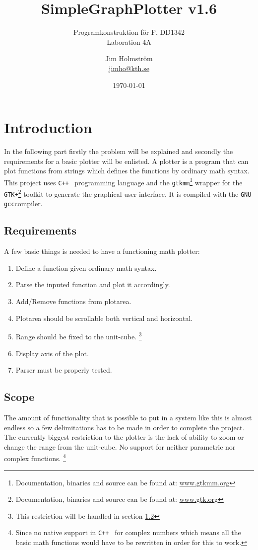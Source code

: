 \documentclass[a4paper,11pt]{kth-mag}
\title{SimpleGraphPlotter v1.6}
\subtitle{Programkonstruktion f\"{o}r F, DD1342\\ Laboration 4A}
\author{Jim Holmstr\"{o}m\\\href{mailto:jimho@kth.se}{jimho@kth.se}}
\date{\today}
\newcommand{\Cpp}{\texttt{C++}}
\newcommand{\Gcc}{\texttt{gcc}}
\newcommand{\Gtkmm}{\texttt{gtkmm}}
\newcommand{\Gtk}{\texttt{GTK+}}
\begin{document}
\frontmatter
\pagestyle{empty}
\removepagenumbers
\maketitle
{}
\tableofcontents*
\mainmatter
\pagestyle{newchap}

\chapter{Introduction}
In the following part firstly the problem will be explained and secondly 
the requirements for a basic plotter will be enlisted.
A plotter is a program that can plot functions from strings which defines the 
functions by ordinary math syntax. 
This project uses \Cpp~ programming language and the 
\Gtkmm\footnote{Documentation, binaries and source can be found at: 
\href{http://www.gtkmm.org}{www.gtkmm.org}} wrapper for the 
\Gtk\footnote{Documentation, binaries and source can be found at: 
\href{http://www.gtk.org}{www.gtk.org}} toolkit to generate the graphical user interface. 
It is compiled with the \texttt{GNU} \Gcc compiler.

\section{Requirements}
A few basic things is needed to have a functioning math plotter:
\begin{enumerate}
\item Define a function given ordinary math syntax.
\item Parse the inputed function and plot it accordingly.
\item Add/Remove functions from plotarea.
\item Plotarea should be scrollable both vertical and horizontal.
\item Range should be fixed to the unit-cube.
        \footnote{This restriction will be handled in section \ref{sec:scope}}
\item Display axis of the plot.
\item Parser must be properly tested.
\end{enumerate}

\section{Scope}
\label{sec:scope}
The amount of functionality that is possible to put in a system like this is
almost endless so a few delimitations has to be made in order to complete the project.
The currently biggest restriction to the plotter is the lack of 
ability to zoom or change the range from the unit-cube.
No support for neither parametric nor complex functions.
\footnote{
    Since no native support in \Cpp~ for complex numbers which means 
    all the basic math functions would have to be rewritten in order for this to work.
}
\end{document}
